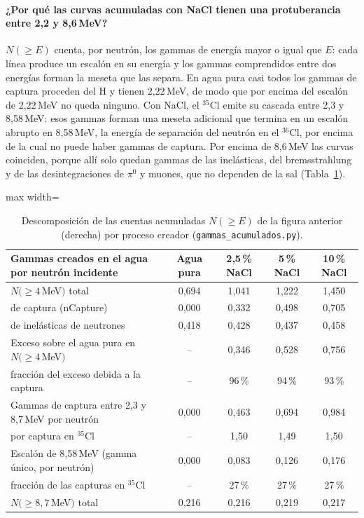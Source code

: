 \documentclass[11pt,a4paper]{article}
\begin{document}
\paragraph{¿Por qué las curvas acumuladas con NaCl tienen una protuberancia entre 2,2 y 8,6\,MeV?}
$N(\geq E)$ cuenta, por neutrón, los gammas de energía mayor o igual que $E$: cada línea produce un escalón en su energía y los gammas comprendidos entre dos energías forman la meseta que las separa.
En agua pura casi todos los gammas de captura proceden del H y tienen 2,22\,MeV, de modo que por encima del escalón de 2,22\,MeV no queda ninguno.
Con NaCl, el $^{35}$Cl emite su cascada entre 2,3 y 8,58\,MeV: esos gammas forman una meseta adicional que termina en un escalón abrupto en 8,58\,MeV, la energía de separación del neutrón en el $^{36}$Cl, por encima de la cual no puede haber gammas de captura.
Por encima de 8,6\,MeV las curvas coinciden, porque allí solo quedan gammas de las inelásticas, del bremsstrahlung y de las desintegraciones de $\pi^0$ y muones, que no dependen de la sal (Tabla~\ref{tab:protuberancia}).
\begin{table}[H]\centering\small\begin{adjustbox}{max width=\linewidth}\begin{tabular}{lcccc}\toprule
Gammas creados en el agua por neutrón incidente & Agua pura & 2,5\,\% NaCl & 5\,\% NaCl & 10\,\% NaCl \\\midrule
$N(\geq 4\,$MeV$)$ total & 0,694 & 1,041 & 1,222 & 1,450 \\
\quad de captura (nCapture) & 0,000 & 0,332 & 0,498 & 0,705 \\
\quad de inelásticas de neutrones & 0,418 & 0,428 & 0,437 & 0,458 \\
Exceso sobre el agua pura en $N(\geq 4\,$MeV$)$ & -- & 0,346 & 0,528 & 0,756 \\
\quad fracción del exceso debida a la captura & -- & 96\,\% & 94\,\% & 93\,\% \\
Gammas de captura entre 2,3 y 8,7\,MeV por neutrón & 0,000 & 0,463 & 0,694 & 0,984 \\
\quad por captura en $^{35}$Cl & -- & 1,50 & 1,49 & 1,50 \\
Escalón de 8,58\,MeV (gamma único, por neutrón) & 0,000 & 0,083 & 0,126 & 0,176 \\
\quad fracción de las capturas en $^{35}$Cl & -- & 27\,\% & 27\,\% & 27\,\% \\
$N(\geq 8{,}7\,$MeV$)$ total & 0,216 & 0,216 & 0,219 & 0,217 \\
\bottomrule\end{tabular}\end{adjustbox}
\caption{Descomposición de las cuentas acumuladas $N(\geq E)$ de la figura anterior (derecha) por proceso creador (\texttt{gammas\_acumulados.py}).}\label{tab:protuberancia}\end{table}
\end{document}
